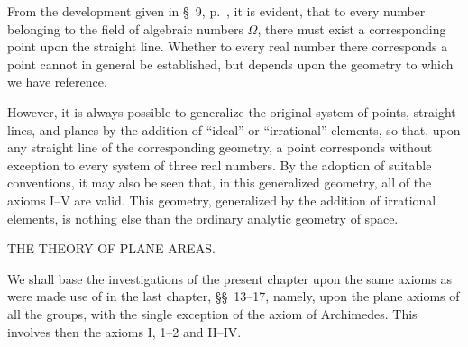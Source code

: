 \documentclass[11pt,oneside]{book}
\begin{document}
From the development given in \S~9, p.~\pageref{folio27}, it is
evident, that to every number belonging to the field of
\label{folio56}
algebraic numbers $\Omega$, there must exist a corresponding
point upon the straight line. Whether to every
real number there corresponds a point cannot in general
be established, but depends upon the geometry to
which we have reference.

However, it is always possible to generalize the
original system of points, straight lines, and planes
by the addition of ``ideal'' or ``irrational'' elements,
so that, upon any straight line of the corresponding
geometry, a point corresponds without exception to
every system of three real numbers. By the adoption
of suitable conventions, it may also be seen that, in
this generalized geometry, all of the axioms I--V are
valid. This geometry, generalized by the addition of
irrational elements, is nothing else than the ordinary
analytic geometry of space.
\newpage
\begin{center}{\Large THE THEORY OF PLANE AREAS.}\end{center}
\label{p18}

We shall base the investigations of the present
chapter upon the same axioms as were made
use of in the last chapter, \S\S~13--17, namely, upon the
plane axioms of all the groups, with the single exception
of the axiom of Archimedes. This involves then
the axioms I, 1--2 and II--IV.
\end{document}
